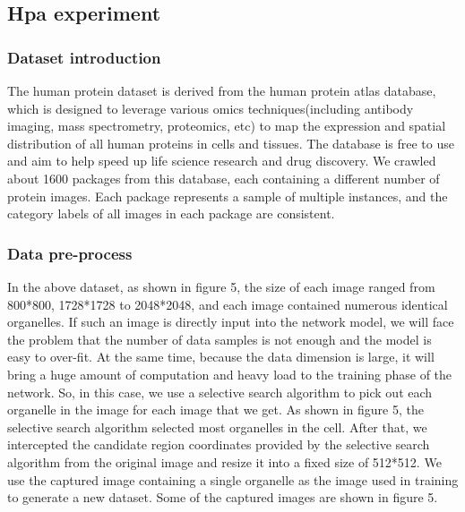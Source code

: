 \documentclass[10pt,twocolumn,letterpaper]{article}
\begin{document}
\subsection{Hpa experiment}

\subsubsection{Dataset introduction}
The human protein dataset is derived from the human protein atlas database, which is designed to leverage various omics techniques(including antibody imaging, mass spectrometry, proteomics, etc) to map the expression and spatial distribution of all human proteins in cells and tissues. The database is free to use and aim to help speed up life science research and drug discovery. We crawled about 1600 packages from this database, each containing a different number of protein images. Each package represents a sample of multiple instances, and the category labels of all images in each package are consistent.

\subsubsection{Data pre-process}
In the above dataset, as shown in figure 5, the size of each image ranged from 800*800, 1728*1728 to 2048*2048, and each image contained numerous identical organelles. If such an image is directly input into the network model, we will face the problem that the number of data samples is not enough and the model is easy to over-fit. At the same time, because the data dimension is large, it will bring a huge amount of computation and heavy load to the training phase of the network. So, in this case, we use a selective search algorithm to pick out each organelle in the image for each image that we get. As shown in figure 5, the selective search algorithm selected most organelles in the cell. After that, we intercepted the candidate region coordinates provided by the selective search algorithm from the original image and resize it into a fixed size of 512*512. We use the captured image containing a single organelle as the image used in training to generate a new dataset. Some of the captured images are shown in figure 5.

\end{document}
